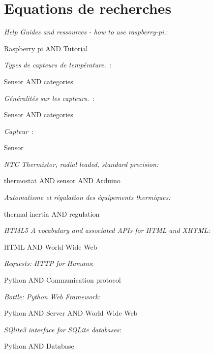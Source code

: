 \documentclass[12pt]{report}
\begin{document}
\section{Equations de recherches}
\textit{Help Guides and ressources - how to
use raspberry-pi.}:

Raspberry pi AND Tutorial

\vspace*{0.3cm}

\textit{Types de capteurs de temp\'{e}rature}\textit{.~}:

Sensor AND categories

\vspace*{0.3cm}

\textit{ G\'{e}n\'{e}ralit\'{e}s sur les capteurs.~}:


Sensor AND categories

\vspace*{0.3cm}

\textit{Capteur}\textit{~}:

Sensor

\vspace*{0.3cm}


\textit{NTC Thermistor, radial leaded, standard precision:} 

thermostat AND sensor AND Arduino
\vspace*{0.3cm}

\textit{Automatisme et r\'{e}gulation des \'{e}quipements thermiques:}

thermal inertia AND regulation
\vspace*{0.3cm}


\textit{HTML5 A vocabulary and associated APIs for HTML and XHTML:}

HTML AND World Wide Web

\vspace*{0.3cm}

\textit{Requests: HTTP for Humans}:

Python AND Communication protocol

\vspace*{0.3cm}

\textit{Bottle: Python Web Framework}:

Python AND Server AND World Wide Web

\vspace*{0.3cm}

\textit{SQlite3 interface for SQLite databases}:

Python AND Database

\vspace*{0.3cm}
\end{document}
